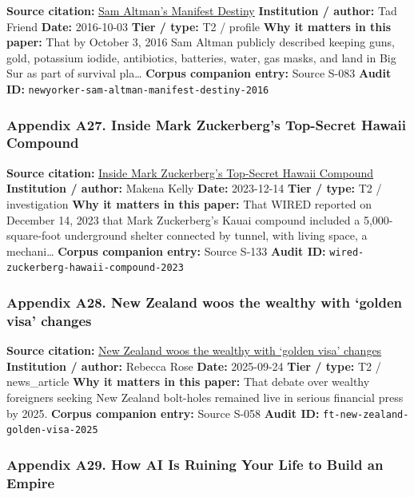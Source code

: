 \documentclass[
  american,
  11pt,
  letterpaper,
]{article}
\begin{document}
\textbf{Source citation:}
\href{https://www.newyorker.com/magazine/2016/10/10/sam-altmans-manifest-destiny}{Sam
Altman's Manifest Destiny} \textbf{Institution / author:} Tad Friend
\textbf{Date:} 2016-10-03 \textbf{Tier / type:} T2 / profile \textbf{Why
it matters in this paper:} That by October 3, 2016 Sam Altman publicly
described keeping guns, gold, potassium iodide, antibiotics, batteries,
water, gas masks, and land in Big Sur as part of survival pla\ldots{}
\textbf{Corpus companion entry:} Source S-083 \textbf{Audit ID:}
\texttt{newyorker-sam-altman-manifest-destiny-2016}

\subsubsection{Appendix A27. Inside Mark Zuckerberg's Top-Secret Hawaii
Compound}\label{appendix-a27-inside-mark-zuckerbergs-top-secret-hawaii-compound}

\textbf{Source citation:}
\href{https://www.wired.com/story/mark-zuckerberg-inside-hawaii-compound}{Inside
Mark Zuckerberg's Top-Secret Hawaii Compound} \textbf{Institution /
author:} Makena Kelly \textbf{Date:} 2023-12-14 \textbf{Tier / type:} T2
/ investigation \textbf{Why it matters in this paper:} That WIRED
reported on December 14, 2023 that Mark Zuckerberg's Kauai compound
included a 5,000-square-foot underground shelter connected by tunnel,
with living space, a mechani\ldots{} \textbf{Corpus companion entry:}
Source S-133 \textbf{Audit ID:}
\texttt{wired-zuckerberg-hawaii-compound-2023}

\subsubsection{Appendix A28. New Zealand woos the wealthy with `golden
visa'
changes}\label{appendix-a28-new-zealand-woos-the-wealthy-with-golden-visa-changes}

\textbf{Source citation:}
\href{https://www.ft.com/content/76ca455c-3b16-4413-8738-3f17431d125b}{New
Zealand woos the wealthy with `golden visa' changes} \textbf{Institution
/ author:} Rebecca Rose \textbf{Date:} 2025-09-24 \textbf{Tier / type:}
T2 / news\_article \textbf{Why it matters in this paper:} That debate
over wealthy foreigners seeking New Zealand bolt-holes remained live in
serious financial press by 2025. \textbf{Corpus companion entry:} Source
S-058 \textbf{Audit ID:} \texttt{ft-new-zealand-golden-visa-2025}

\subsubsection{Appendix A29. How AI Is Ruining Your Life to Build an
Empire}\label{appendix-a29-how-ai-is-ruining-your-life-to-build-an-empire}
\end{document}

